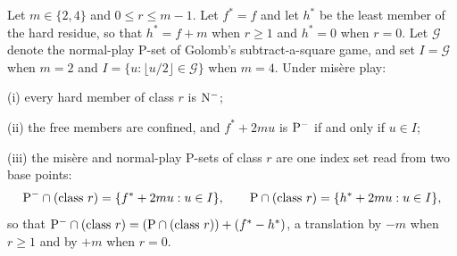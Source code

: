\begin{proposition}\label{prop:misere-swap}
Let $m \in \{2,4\}$ and $0 \le r \le m-1$. Let $f^* = f$ and let $h^*$ be
the least member of the hard residue, so that $h^* = f + m$ when
$r \ge 1$ and $h^* = 0$ when $r = 0$. Let $\mathcal{G}$ denote the
normal-play P-set of Golomb's subtract-a-square game, and set
$I = \mathcal{G}$ when $m = 2$ and
$I = \{u : \lfloor u/2 \rfloor \in \mathcal{G}\}$ when $m = 4$. Under
mis\`ere play:

(i) every hard member of class $r$ is $\mathrm{N}^-$;

(ii) the free members are confined, and $f^* + 2mu$ is $\mathrm{P}^-$ if and
only if $u \in I$;

(iii) the mis\`ere and normal-play P-sets of class $r$ are one index set
read from two base points:
\[ \mathrm{P}^- \cap (\text{class } r) = \{ f^* + 2mu : u \in I \}, \qquad
\mathrm{P} \cap (\text{class } r) = \{ h^* + 2mu : u \in I \}, \]
so that
$\mathrm{P}^- \cap (\text{class } r) = (\mathrm{P} \cap (\text{class } r)) + (f^* - h^*)$,
a translation by $-m$ when $r \ge 1$ and by $+m$ when $r = 0$.
\end{proposition}
